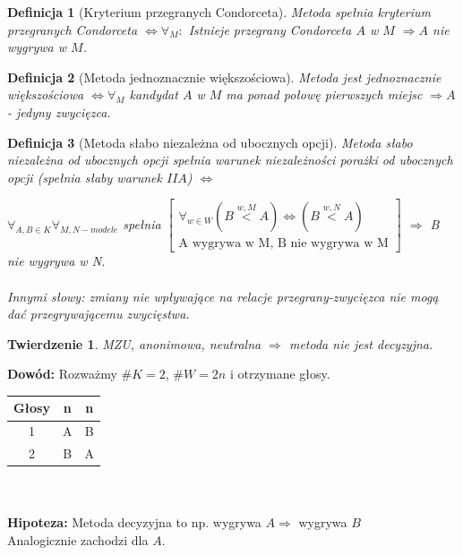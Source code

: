 \documentclass[12pt,a4paper]{article}
\theoremstyle{break}
\newtheorem{definition}{Definicja}[section]
\newtheorem{theorem}{Twierdzenie}[section]
\newcommand{\witw}{$\Leftrightarrow$}
\begin{document}
		\begin{definition}[Kryterium przegranych Condorceta]			
			Metoda spełnia kryterium przegranych Condorceta \witw $\forall_M:$ Istnieje przegrany Condorceta $A$ w $M$ $\Rightarrow A$ nie wygrywa w $M$.
		\end{definition}
		
		\begin{definition}[Metoda jednoznacznie większościowa]
			Metoda jest jednoznacznie większościowa \witw $\forall_M$ kandydat $A$ w $M$ ma ponad połowę pierwszych miejsc $\Rightarrow A$ - jedyny zwycięzca.
		\end{definition}
		
		\begin{definition}[Metoda słabo niezależna od ubocznych opcji]
			Metoda słabo niezależna od ubocznych opcji spełnia warunek niezależności porażki od ubocznych opcji (spełnia słaby warunek $IIA$) \witw
			
			$\forall_{A,B\in K} \forall_{M,N - modele}$ spełnia 
			$\begin{bmatrix}
				\forall_{w\in W} (B\overset{w,M}{<}A) \text{\witw} (B\overset{w,N}{<}A) \\
				\text{A wygrywa w M, B nie wygrywa w M}		 
			\end{bmatrix}$	$\Rightarrow$ B nie wygrywa w N.\\\\
			
			Innymi słowy: zmiany nie wpływające na relacje przegrany-zwycięzca nie mogą dać przegrywającemu zwycięstwa.		
			
		\end{definition}
		
		\begin{theorem}
			MZU, anonimowa, neutralna $\Rightarrow$ metoda nie jest decyzyjna.
		\end{theorem}
		\noindent \textbf{Dowód:} Rozważmy $\# K = 2$, $\# W = 2n$ i otrzymane głosy.\\
		
		\begin{tabular}{|c|c|c|}\hline
			Głosy&n&n\\\hline
			1&A&B\\\hline
			2&B&A\\\hline
		\end{tabular}\\\\
		\textbf{Hipoteza:} Metoda decyzyjna to np. wygrywa $A \Rightarrow$ wygrywa $B$ \faBolt\\
		Analogicznie zachodzi dla $A$.
		
\end{document}
